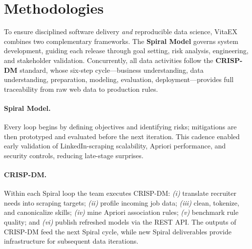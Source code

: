 \documentclass[runningheads]{llncs}
\begin{document}
\newpage
\section{Methodologies}
\label{sec:methodologies}

To ensure disciplined software delivery \emph{and} reproducible data science, VitaEX combines two complementary frameworks.  
The \textbf{Spiral Model} governs system development, guiding each release through goal setting, risk analysis, engineering, and stakeholder validation.  
Concurrently, all data activities follow the \textbf{CRISP-DM} standard, whose six-step cycle—business understanding, data understanding, preparation, modeling, evaluation, deployment—provides full traceability from raw web data to production rules.

\paragraph{\textbf{Spiral Model.}}
Every loop begins by defining objectives and identifying risks; mitigations are then prototyped and evaluated before the next iteration.  
This cadence enabled early validation of LinkedIn-scraping scalability, Apriori performance, and security controls, reducing late-stage surprises.

\paragraph{\textbf{CRISP-DM.}}
Within each Spiral loop the team executes CRISP-DM:  
\emph{(i)} translate recruiter needs into scraping targets;  
\emph{(ii)} profile incoming job data;  
\emph{(iii)} clean, tokenize, and canonicalize skills;  
\emph{(iv)} mine Apriori association rules;  
\emph{(v)} benchmark rule quality; and  
\emph{(vi)} publish refreshed models via the REST API.  
The outputs of CRISP-DM feed the next Spiral cycle, while new Spiral deliverables provide infrastructure for subsequent data iterations.
\end{document}
